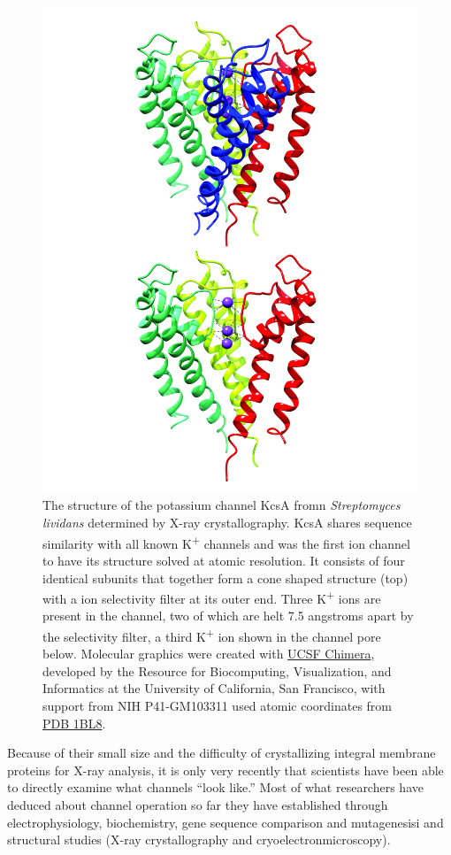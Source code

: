 \begin{figure}

{\centering \includegraphics[width=0.7\linewidth]{./figures/potential/Kcsa} 

}

\caption{The structure of the potassium channel KcsA fromn \emph{Streptomyces lividans} determined by X-ray crystallography. KcsA shares sequence similarity with all known K\textsuperscript{+} channels and was the first ion channel to have its structure solved at atomic resolution. It consists of four identical subunits that together form a cone shaped structure (top) with a ion selectivity filter at its outer end. Three K\textsuperscript{+} ions are present in the channel, two of which are helt 7.5 angstroms apart by the selectivity filter, a third K\textsuperscript{+} ion shown in the channel pore below. Molecular graphics were created with \href{http://www.rbvi.ucsf.edu/chimera/}{UCSF Chimera}, developed by the Resource for Biocomputing, Visualization, and Informatics at the University of California, San Francisco, with support from NIH P41-GM103311 used atomic coordinates from \href{https://www.rcsb.org/structure/1BL8}{PDB 1BL8}.}\label{fig:kchannel}
\end{figure}

Because of their small size and the difficulty of crystallizing integral membrane proteins for X-ray analysis, it is only very recently that scientists have been able to directly examine what channels ``look like.'' Most of what researchers have deduced about channel operation so far they have established through electrophysiology, biochemistry, gene sequence comparison and mutagenesisi and structural studies (X-ray crystallography and cryoelectronmicroscopy).

